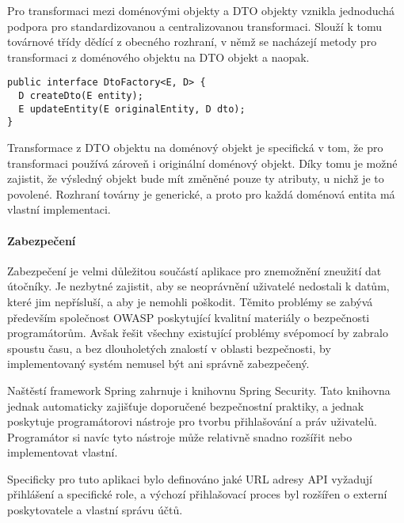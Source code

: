 			Pro transformaci mezi doménovými objekty a \ac{DTO} objekty vznikla jednoduchá podpora pro standardizovanou
			a centralizovanou transformaci.
			Slouží k tomu továrnové třídy dědící z obecného rozhraní, v němž se nacházejí metody pro transformaci z doménového
			objektu na \ac{DTO} objekt a naopak.

			\begin{codeblock}
				\begin{verbatim}
public interface DtoFactory<E, D> {
  D createDto(E entity);
  E updateEntity(E originalEntity, D dto);
}
				\end{verbatim}
			\end{codeblock}

			Transformace z \ac{DTO} objektu na doménový objekt je specifická v tom, že pro transformaci používá zároveň
			i originální doménový objekt.
			Díky tomu je možné zajistit, že výsledný objekt bude mít změněné pouze ty atributy, u nichž je to povolené.
			Rozhraní továrny je generické, a proto pro každá doménová entita má vlastní implementaci.

			\paragraph{Zabezpečení}

			Zabezpečení je velmi důležitou součástí aplikace pro znemožnění zneužití dat útočníky.
			Je nezbytné zajistit, aby se neoprávnění uživatelé nedostali k datům, které jim nepřísluší, a aby je nemohli
			poškodit.
			Těmito problémy se zabývá především společnost OWASP poskytující kvalitní materiály o bezpečnosti programátorům.
			Avšak řešit všechny existující problémy svépomocí by zabralo spoustu času, a bez dlouholetých znalostí v
			oblasti bezpečnosti, by implementovaný systém nemusel být ani správně zabezpečený.

			Naštěstí framework Spring zahrnuje i knihovnu Spring Security.
			Tato knihovna jednak automaticky zajišťuje doporučené bezpečnostní praktiky, a jednak poskytuje programátorovi
			nástroje pro tvorbu přihlašování a práv uživatelů.
			Programátor si navíc tyto nástroje může relativně snadno rozšířit nebo implementovat vlastní.

			Specificky pro tuto aplikaci bylo definováno jaké \ac{URL} adresy \ac{API} vyžadují přihlášení a specifické
			role, a výchozí přihlašovací proces byl rozšířen o externí poskytovatele a vlastní správu účtů.

